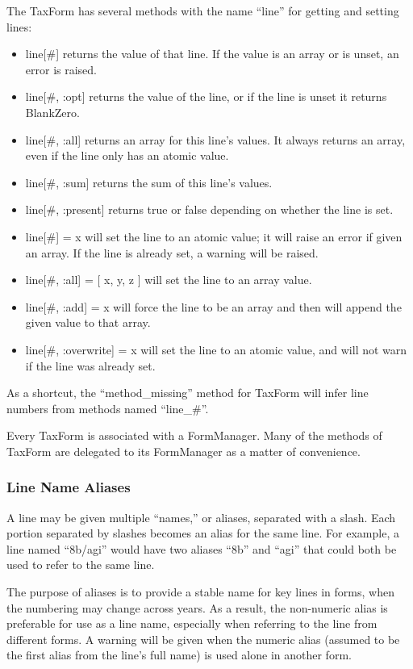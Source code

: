The TaxForm has several methods with the name ``line'' for getting and setting
lines:
\begin{itemize}
\item line[\#] returns the value of that line. If the value is an array or is
unset, an error is raised.
\item line[\#, :opt] returns the value of the line, or if the line is
unset it returns BlankZero.
\item line[\#, :all] returns an array for this line's values. It always returns
an array, even if the line only has an atomic value.
\item line[\#, :sum] returns the sum of this line's values.
\item line[\#, :present] returns true or false depending on whether the line is
set.
\item line[\#] = x will set the line to an atomic value; it will raise an error
if given an array. If the line is already set, a warning will be raised.
\item line[\#, :all] = [ x, y, z ] will set the line to an array value.
\item line[\#, :add] = x will force the line to be an array and then will append
the given value to that array.
\item line[\#, :overwrite] = x will set the line to an atomic value, and will
not warn if the line was already set.
\end{itemize}
As a shortcut, the ``method\_missing'' method for TaxForm will infer line
numbers from methods named ``line\_\#''.

Every TaxForm is associated with a FormManager. Many of the methods of TaxForm
are delegated to its FormManager as a matter of convenience.

\subsubsection{Line Name Aliases}

A line may be given multiple ``names,'' or aliases, separated with a slash. Each
portion separated by slashes becomes an alias for the same line. For example, a
line named ``8b/agi'' would have two aliases ``8b'' and ``agi'' that could both
be used to refer to the same line.

The purpose of aliases is to provide a stable name for key lines in forms, when
the numbering may change across years. As a result, the non-numeric alias is
preferable for use as a line name, especially when referring to the line from
different forms. A warning will be given when the numeric alias (assumed to be
the first alias from the line's full name) is used alone in another form.

